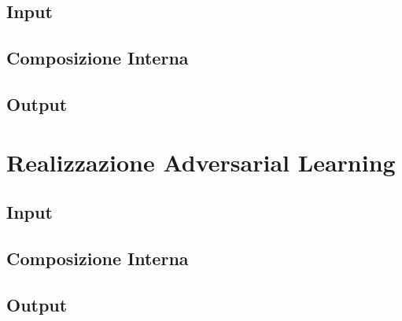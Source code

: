 \subsection{Input}
\label{classificatorenninput}

\subsection{Composizione Interna}
\label{classificatorenninterno}

\subsection{Output}
\label{classificatorennoutput}

\section{Realizzazione Adversarial Learning}
\label{adv}

\subsection{Input}
\label{advinput}

\subsection{Composizione Interna}
\label{advinterno}

\subsection{Output}
\label{advoutput}

